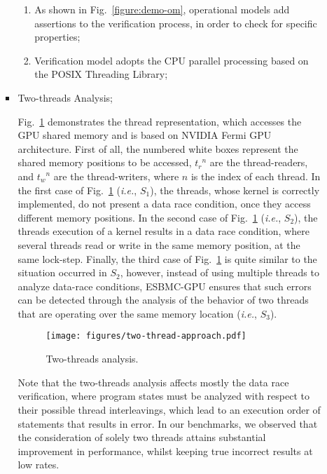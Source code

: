 \documentclass{llncs}
\begin{document}
\begin{enumerate}
\begin{itemize}
\begin{itemize}
		\begin{enumerate}
			\item As shown in Fig.~\ref{figure:demo-om}, operational models add assertions to the verification process, in order to check for specific properties;
			\item Verification model adopts the CPU parallel processing based on the POSIX Threading Library; \\
		\end{enumerate}

	\item Two-threads Analysis;
		
	Fig.~\ref{figure:demo-two} demonstrates the thread representation, which accesses the GPU shared memory and is based on NVIDIA Fermi GPU architecture. First of all, the numbered white boxes represent the shared memory positions to be accessed, ${t_{r}}^n$ are the thread-readers, and ${t_{w}}^n$ are the thread-writers, where $n$ is the index of each thread. %
	In the first case of Fig.~\ref{figure:demo-two} (\textit{i.e.}, $S_{1}$), the threads, whose kernel is correctly implemented, do not present a data race condition, once they access different memory positions. In the second case of Fig.~\ref{figure:demo-two} (\textit{i.e.}, $S_{2}$), the threads execution of a kernel results in a data race condition, where several threads read or write in the same memory position, at the same lock-step. Finally, the third case of Fig.~\ref{figure:demo-two} is quite similar to the situation occurred in $S_{2}$, however, instead of using multiple threads to analyze data-race conditions, ESBMC-GPU ensures that such errors can be detected through the analysis of the behavior of two threads that are operating over the same memory location ({\it i.e.}, $S_3$).

		\begin{figure}[htb]
  			\centering
  			\texttt{[image: figures/two-thread-approach.pdf]}
  			\caption{Two-threads analysis.}
  			\label{figure:demo-two}
		\end{figure}
		
Note that the two-threads analysis affects mostly the data race verification, where program states must be analyzed with respect to their possible thread interleavings, which lead to an execution order of statements that results in error. In our benchmarks, we observed that the consideration of solely two threads attains substantial improvement in performance, whilst keeping true incorrect results at low rates.\\


\end{itemize}
\end{itemize}
\end{enumerate}
\end{document}

